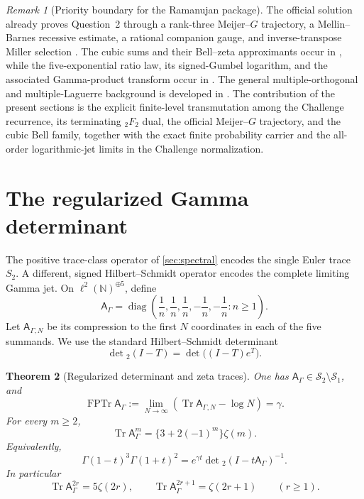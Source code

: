 \documentclass[11pt]{article}
\newtheorem{theorem}{Theorem}[section]
\theoremstyle{definition}
\theoremstyle{remark}
\newtheorem{remark}[theorem]{Remark}
\newcommand{\N}{\mathbb N}
\newcommand{\Tr}{\operatorname{Tr}}
\newcommand{\diag}{\operatorname{diag}}
\newcommand{\FPTr}{\operatorname{FPTr}}
\begin{document}
\begin{remark}[Priority boundary for the Ramanujan package]
The official solution already proves Question~2 through a rank-three
Meijer--\(G\) trajectory, a Mellin--Barnes recessive estimate, a rational
companion gauge, and inverse-transpose Miller selection
\cite{RamanujanOfficial2026}.  The cubic sums and their Bell--zeta
approximants occur in \cite{PilehroodBell2012,Pilehrood2013}, while the
five-exponential ratio law, its signed-Gumbel logarithm, and the associated
Gamma-product transform occur in \cite{Powers2023}.  The general
multiple-orthogonal and multiple-Laguerre background is developed in
\cite{VanAsscheWolfs2023,WolfsVanAssche2025}.  The contribution of the
present sections is the explicit finite-level transmutation among the
Challenge recurrence, its terminating \({}_2F_2\) dual, the official
Meijer--\(G\) trajectory, and the cubic Bell family, together with the exact
finite probability carrier and the all-order logarithmic-jet limits in the
Challenge normalization.
\end{remark}

\section{The regularized Gamma determinant}
\label{sec:gamma-determinant}

The positive trace-class operator of \cref{sec:spectral} encodes the single
Euler trace \(S_2\).  A different, signed Hilbert--Schmidt operator encodes
the complete limiting Gamma jet.  On
\(\ell^2(\N)^{\oplus5}\), define
\begin{equation}\label{eq:A-Gamma}
 \mathsf A_\Gamma=\diag\left(
 \frac1n,\frac1n,\frac1n,-\frac1n,-\frac1n:n\ge1\right).
\end{equation}
Let \(\mathsf A_{\Gamma,N}\) be its compression to the first \(N\)
coordinates in each of the five summands.  We use the standard
Hilbert--Schmidt determinant
\[
 \det{}_2(I-T)=\det\bigl((I-T)e^T\bigr).
\]

\begin{theorem}[Regularized determinant and zeta traces]
\label{thm:gamma-det2}
One has
\(\mathsf A_\Gamma\in\mathcal S_2\setminus\mathcal S_1\), and
\begin{equation}\label{eq:FP-trace-gamma}
 \boxed{\displaystyle
 \FPTr\mathsf A_\Gamma
 :=\lim_{N\to\infty}
 \left(\Tr\mathsf A_{\Gamma,N}-\log N\right)=\gamma.}
\end{equation}
For every \(m\ge2\),
\begin{equation}\label{eq:Gamma-operator-traces}
 \boxed{\displaystyle
 \Tr\mathsf A_\Gamma^m
 =\{3+2(-1)^m\}\zeta(m).}
\end{equation}
Equivalently,
\begin{equation}\label{eq:Gamma-det2}
 \boxed{\displaystyle
 \Gamma(1-t)^3\Gamma(1+t)^2
 =e^{\gamma t}\det{}_2(I-t\mathsf A_\Gamma)^{-1}.}
\end{equation}
In particular
\begin{equation}\label{eq:Gamma-even-odd-traces}
 \Tr\mathsf A_\Gamma^{2r}=5\zeta(2r),\qquad
 \Tr\mathsf A_\Gamma^{2r+1}=\zeta(2r+1)\qquad(r\ge1).
\end{equation}
\end{theorem}
\end{document}
